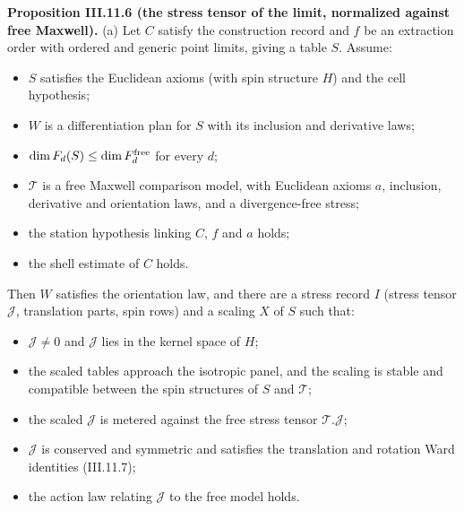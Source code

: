 \documentclass[
  letterpaper,
  11pt]{article}
\providecommand{\tightlist}{%
  \setlength{\itemsep}{0pt}\setlength{\parskip}{0pt}}
\begin{document}
\textbf{Proposition III.11.6 (the stress tensor of the limit, normalized
against free Maxwell).} (a) Let \(C\) satisfy the construction record
and \(f\) be an extraction order with ordered and generic point limits,
giving a table \(S\). Assume:

\begin{itemize}
\tightlist
\item
  \(S\) satisfies the Euclidean axioms (with spin structure \(H\)) and
  the cell hypothesis;
\item
  \(W\) is a differentiation plan for \(S\) with its inclusion and
  derivative laws;
\item
  \(\dim F_d(S)\le\dim F_d^{\rm free}\) for every \(d\);
\item
  \(\mathcal T\) is a free Maxwell comparison model, with Euclidean
  axioms \(a\), inclusion, derivative and orientation laws, and a
  divergence-free stress;
\item
  the station hypothesis linking \(C\), \(f\) and \(a\) holds;
\item
  the shell estimate of \(C\) holds.
\end{itemize}

Then \(W\) satisfies the orientation law, and there are a stress record
\(I\) (stress tensor \(\mathcal J\), translation parts, spin rows) and a
scaling \(X\) of \(S\) such that:

\begin{itemize}
\tightlist
\item
  \(\mathcal J\neq0\) and \(\mathcal J\) lies in the kernel space of
  \(H\);
\item
  the scaled tables approach the isotropic panel, and the scaling is
  stable and compatible between the spin structures of \(S\) and
  \(\mathcal T\);
\item
  the scaled \(\mathcal J\) is metered against the free stress tensor
  \(\mathcal T.\mathcal J\);
\item
  \(\mathcal J\) is conserved and symmetric and satisfies the
  translation and rotation Ward identities (III.11.7);
\item
  the action law relating \(\mathcal J\) to the free model holds.
\end{itemize}
\end{document}
